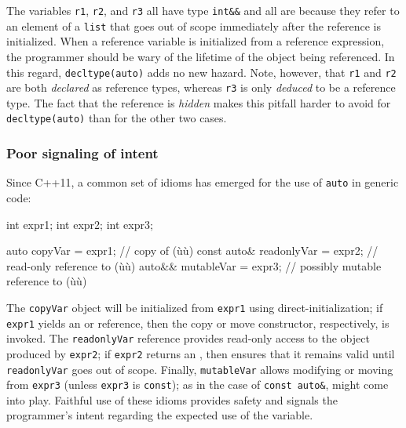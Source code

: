 The variables \lstinline!r1!, \lstinline!r2!, and \lstinline!r3! all have type
\lstinline!int&&! and all are  because they
refer to an element of a \lstinline!list! that goes out of scope
immediately after the reference is initialized. When a reference
variable is initialized from a reference expression, the programmer
should be wary of the lifetime of the object being referenced. In this
regard, \lstinline!decltype(auto)! adds no new hazard. Note, however, that
\lstinline!r1! and \lstinline!r2! are both \emph{declared} as reference types,
whereas \lstinline!r3! is only \emph{deduced} to be a reference type. The
fact that the reference is \emph{hidden} makes this pitfall harder to
avoid for \lstinline!decltype(auto)! than for the other two cases.

\subsubsection[Poor signaling of intent]{Poor signaling of intent}\label{poor-signaling-of-intent}

Since C++11, a common set of idioms has emerged for the use of
\lstinline!auto! in generic code:

\begin{emcppshiddenlisting}[emcppsbatch=e5]
int expr1;
int expr2;
int expr3;
\end{emcppshiddenlisting}
\begin{emcppslisting}[emcppsbatch=e5]
auto        copyVar     = expr1;  // copy of (ù{}ù)
const auto& readonlyVar = expr2;  // read-only reference to (ù{}ù)
auto&&      mutableVar  = expr3;  // possibly mutable reference to (ù{}ù)
\end{emcppslisting}
    

The \lstinline!copyVar! object will be initialized from \lstinline!expr1!
using direct-initialization; if \lstinline!expr1! yields an 
or  reference, then the copy or move constructor,
respectively, is invoked. The \lstinline!readonlyVar! reference provides
read-only access to the object produced by \lstinline!expr2!; if
\lstinline!expr2! returns an , then  ensures that it remains valid until \lstinline!readonlyVar! goes
out of scope. Finally, \lstinline!mutableVar! allows modifying or moving
from \lstinline!expr3! (unless \lstinline!expr3! is \lstinline!const!); as in the
case of \lstinline!const!~\lstinline!auto&!, 
might come into play. Faithful use of these idioms provides safety and
signals the programmer's intent regarding the expected use of the
variable.

